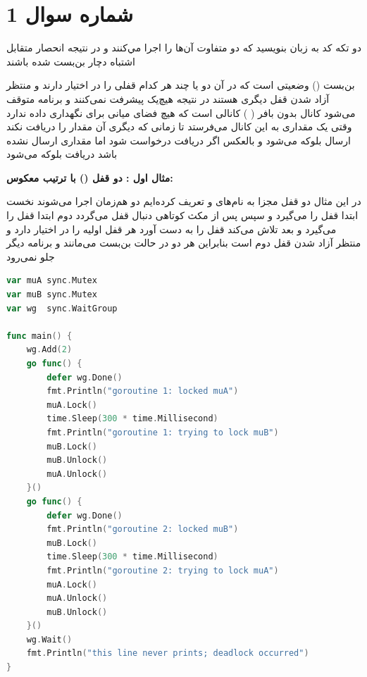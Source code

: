 
\section*{شماره سوال 1}

دو تكه كد به زبان  بنويسيد كه دو  متفاوت آن‌ها را اجرا مي‌كنند و در نتيجه انحصار متقابل اشتباه دچار بن‌بست شده باشند

\bigskip

بن‌بست () وضعیتی است که در آن دو یا چند  هر کدام قفلی را در اختیار دارند و منتظر آزاد شدن قفل دیگری هستند در نتیجه هیچ‌یک پیشرفت نمی‌کنند و برنامه متوقف می‌شود کانال بدون بافر ( ) کانالی است که هیچ فضای میانی برای نگهداری داده ندارد وقتی یک  مقداری به این کانال می‌فرستد تا زمانی که  دیگری آن مقدار را دریافت نکند ارسال بلوکه می‌شود و بالعکس اگر دریافت درخواست شود اما مقداری ارسال نشده باشد دریافت بلوکه می‌شود

\bigskip

\textbf{مثال اول : دو قفل () با ترتیب معکوس:}

در این مثال دو قفل مجزا به نام‌های  و  تعریف کرده‌ایم دو  هم‌زمان اجرا می‌شوند  نخست ابتدا قفل  را می‌گیرد و سپس پس از مکث کوتاهی دنبال قفل  می‌گردد  دوم ابتدا قفل  را می‌گیرد و بعد تلاش می‌کند قفل  را به دست آورد هر  قفل اولیه را در اختیار دارد و منتظر آزاد شدن قفل دوم است بنابراین هر دو در حالت بن‌بست می‌مانند و برنامه دیگر جلو نمی‌رود

\medskip

\begin{latin}
\begin{lstlisting}[language=Go]
var muA sync.Mutex
var muB sync.Mutex
var wg  sync.WaitGroup

func main() {
    wg.Add(2)
    go func() {
        defer wg.Done()
        fmt.Println("goroutine 1: locked muA")
        muA.Lock()
        time.Sleep(300 * time.Millisecond)
        fmt.Println("goroutine 1: trying to lock muB")
        muB.Lock()
        muB.Unlock()
        muA.Unlock()
    }()
    go func() {
        defer wg.Done()
        fmt.Println("goroutine 2: locked muB")
        muB.Lock()
        time.Sleep(300 * time.Millisecond)
        fmt.Println("goroutine 2: trying to lock muA")
        muA.Lock()
        muA.Unlock()
        muB.Unlock()
    }()
    wg.Wait()
    fmt.Println("this line never prints; deadlock occurred")
}
\end{lstlisting}
\end{latin}

